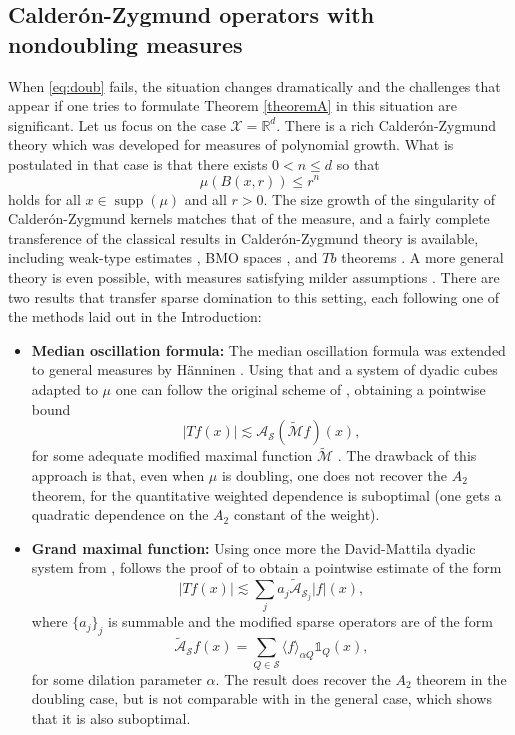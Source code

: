 \documentclass[12pt]{amsart}
\newcommand{\R}{\mathbb{R}}
\newcommand{\supp}[1]{\operatorname{supp}\left(#1\right) }
\newcommand{\one}{\mathds{1}}
\newcommand{\Ss}{\mathcal{S}}
\newcommand{\AS}{\mathcal{A}_{\Ss}}
\theoremstyle{plain}
\theoremstyle{definition} %
\numberwithin{equation}{section}
\begin{document}
\subsection{Calder\'on-Zygmund operators with nondoubling measures} When \eqref{eq:doub} fails, the situation changes dramatically and the challenges that appear if one tries to formulate Theorem \ref{theoremA} in this situation are significant. Let us focus on the case $\mathcal{X}=\R^d$. There is a rich Calder\'on-Zygmund theory which was developed for measures of polynomial growth. What is postulated in that case is that there exists $0<n\leq d$ so that
$$
\mu(B(x,r)) \leq r^n
$$
holds for all $x\in\supp{\mu}$ and all $r>0$. The size growth of the singularity of Calder\'on-Zygmund kernels matches that of the measure, and a fairly complete transference of the classical results in Calder\'on-Zygmund theory is available, including weak-type estimates \cite{NTV1997,To2001b}, BMO spaces \cite{To2001}, and $Tb$ theorems \cite{NTV2003}. A more general theory is even possible, with measures satisfying milder assumptions \cite{Hy2010}. There are two results that transfer sparse domination to this setting, each following one of the methods laid out in the Introduction:
\begin{itemize}
    \item \textbf{Median oscillation formula:} The median oscillation formula was extended to general measures by H\"anninen \cite{Ha2017}. Using that and a system of dyadic cubes adapted to $\mu$ \cite{DM2000} one can follow the original scheme of \cite{Le2013}, obtaining a pointwise bound
    $$
    |Tf(x)|\lesssim \AS(\tilde{\mathcal{M}}f)(x),
    $$
    for some adequate modified maximal function $\tilde{\mathcal{M}}$ \cite{CoPa2019}. The drawback of this approach is that, even when $\mu$ is doubling, one does not recover the $A_2$ theorem, for the quantitative weighted dependence is suboptimal (one gets a quadratic dependence on the $A_2$ constant of the weight).
    \item \textbf{Grand maximal function:} Using once more the David-Mattila dyadic system from \cite{DM2000}, \cite{VoZK2018} follows the proof of \cite{Le2016} to obtain a pointwise estimate of the form
    $$
    |Tf(x)|\lesssim \sum_j a_j \tilde{\mathcal{A}}_{\Ss_j}|f|(x),
    $$
    where $\{a_j\}_j$ is summable and the modified sparse operators are of the form 
    $$
    \tilde{\mathcal{A}}_{\Ss} f(x) =\sum_{Q \in \Ss} \langle f\rangle_{\alpha Q} \one_Q(x),
    $$
    for some dilation parameter $\alpha$. The result does recover the $A_2$ theorem in the doubling case, but is not comparable with \cite{CoPa2019} in the general case, which shows that it is also suboptimal.
\end{itemize}
\end{document}
